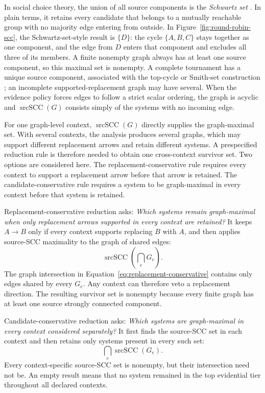 \documentclass[11pt]{article}
\theoremstyle{remark}
\begin{document}
In social choice theory, the union of all source components is the
\emph{Schwartz set} \cite{schwartz1972rationality}. In plain terms, it retains
every candidate that belongs to a mutually reachable group with no majority
edge entering from outside. In Figure~\ref{fig:round-robin-scc}, the
Schwartz-set-style result is $\{D\}$: the cycle $\{A,B,C\}$ stays together as
one component, and the edge from $D$ enters that component and excludes all
three of its members. A finite nonempty graph always has at least one source
component, so this maximal set is nonempty. A complete tournament has a unique
source component, associated with the top-cycle or Smith-set construction
\cite{brandt2016computational}; an incomplete supported-replacement graph may
have several. When the evidence policy forces edges to follow a strict scalar
ordering, the graph is acyclic and $\operatorname{srcSCC}(G)$ consists simply
of the systems with no incoming edge.

For one graph-level context, $\operatorname{srcSCC}(G)$ directly supplies the
graph-maximal set. With several contexts, the analysis produces several
graphs, which may support different replacement arrows and retain different
systems. A prespecified reduction rule is therefore needed to obtain one
cross-context survivor set. Two options are considered here. The
replacement-conservative rule requires every context to support a replacement
arrow before that arrow is retained. The candidate-conservative rule requires
a system to be graph-maximal in every context before that system is retained.

Replacement-conservative reduction asks: \emph{Which systems remain
graph-maximal when only replacement arrows supported in every context are
retained?} It keeps $A\to B$ only if every context supports replacing $B$ with
$A$, and then applies source-SCC maximality to the graph of shared edges:
\begin{equation}
\operatorname{srcSCC}\!\left(\bigcap_e G_e\right).
\label{eq:replacement-conservative}
\end{equation}
The graph intersection in Equation~\eqref{eq:replacement-conservative}
contains only edges shared by every $G_e$. Any context can therefore veto a
replacement direction. The resulting survivor set is nonempty because every
finite graph has at least one source strongly connected component.

Candidate-conservative reduction asks: \emph{Which systems are graph-maximal
in every context considered separately?} It first finds the source-SCC set in
each context and then retains only systems present in every such set:
\begin{equation}
\bigcap_e \operatorname{srcSCC}(G_e).
\label{eq:candidate-conservative}
\end{equation}
Every context-specific source-SCC set is nonempty, but their intersection need
not be. An empty result means that no system remained in the top evidential
tier throughout all declared contexts.
\end{document}
